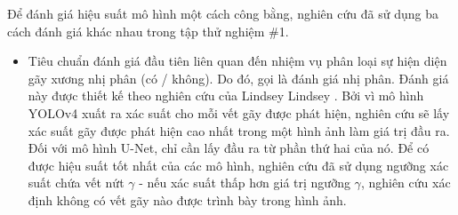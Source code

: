 \documentclass[../the.tex]{subfiles}
\begin{document}
{\fontsize{13}{12} \selectfont
	Để đánh giá hiệu suất mô hình một cách công bằng, nghiên cứu đã sử dụng ba cách đánh giá khác nhau trong tập thử nghiệm \#1.

	\begin{itemize}
		\item Tiêu chuẩn đánh giá đầu tiên liên quan đến nhiệm vụ phân loại sự hiện diện gãy xương nhị phân (có / không). Do đó, gọi là đánh giá nhị phân. Đánh giá này được thiết kế theo nghiên cứu của Lindsey Lindsey \etal  \cite{Lindsey1806905115}. Bởi vì mô hình YOLOv4 xuất ra xác suất cho mỗi vết gãy được phát hiện,  nghiên cứu sẽ lấy xác suất gãy được phát hiện cao nhất trong một hình ảnh làm giá trị đầu ra. Đối với mô hình U-Net, chỉ cần lấy đầu ra từ phần thứ hai của nó. Để có được hiệu suất tốt nhất của các mô hình, nghiên cứu đã sử dụng ngưỡng xác suất chứa vết nứt $\gamma$ - nếu xác suất thấp hơn giá trị ngưỡng $\gamma$, nghiên cứu xác định không có vết gãy nào được trình bày trong hình ảnh.


\end{itemize}}
\end{document}
